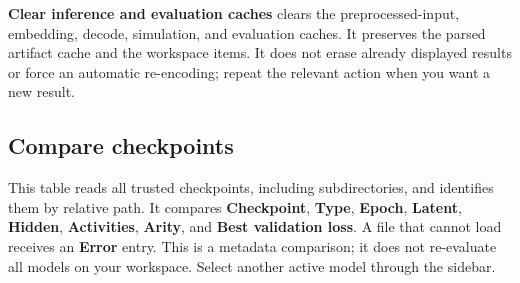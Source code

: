 \documentclass[11pt,a4paper]{article}
\newcommand{\ui}[1]{\textbf{#1}}
\begin{document}
\ui{Clear inference and evaluation caches} clears the preprocessed-input,
embedding, decode, simulation, and evaluation caches. It preserves the parsed
artifact cache and the workspace items. It does not erase already displayed
results or force an automatic re-encoding; repeat the relevant action when
you want a new result.

\subsection{Compare checkpoints}
This table reads all trusted checkpoints, including subdirectories, and
identifies them by relative path. It compares \ui{Checkpoint},
\ui{Type}, \ui{Epoch}, \ui{Latent}, \ui{Hidden}, \ui{Activities},
\ui{Arity}, and \ui{Best validation loss}. A file that cannot load receives an
\ui{Error} entry. This is a metadata comparison; it does not re-evaluate all
models on your workspace. Select another active model through the sidebar.
\end{document}
